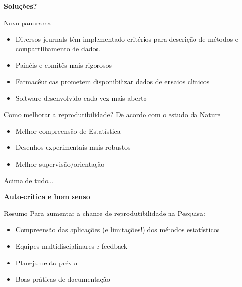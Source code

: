 \documentclass{beamer}
\begin{document}
\begin{frame}
  \begin{center}
    {\bf Soluções?}
  \end{center}
\end{frame}

\begin{frame}{Novo panorama}
  \begin{itemize}{}
  \item Diversos journals têm implementado critérios para descrição de métodos e compartilhamento de dados.
  \item Painéis e comitês mais rigorosos
  \item Farmacêuticas prometem disponibilizar dados de ensaios clínicos
  \item Software desenvolvido cada vez mais aberto
  \end{itemize}
\end{frame}

\begin{frame}
  \begin{block}{Como melhorar a reprodutibilidade?}
    De acordo com o estudo da Nature
    \begin{itemize}
    \item Melhor compreensão de Estatística
    \item Desenhos experimentais mais robustos
    \item Melhor supervisão/orientação
    \end{itemize}
  \end{block}
\end{frame}

\begin{frame}{Acima de tudo...}
  \begin{center}
    {\bf Auto-crítica e bom senso}
  \end{center}
\end{frame}

\begin{frame}{Resumo}
  Para aumentar a chance de reprodutibilidade na Pesquisa:
  \begin{itemize}
  \item Compreensão das aplicações (e limitações!) dos métodos estatísticos
  \item Equipes multidisciplinares e feedback
  \item Planejamento prévio
  \item Boas práticas de documentação
  \end{itemize}
\end{frame}
\end{document}
